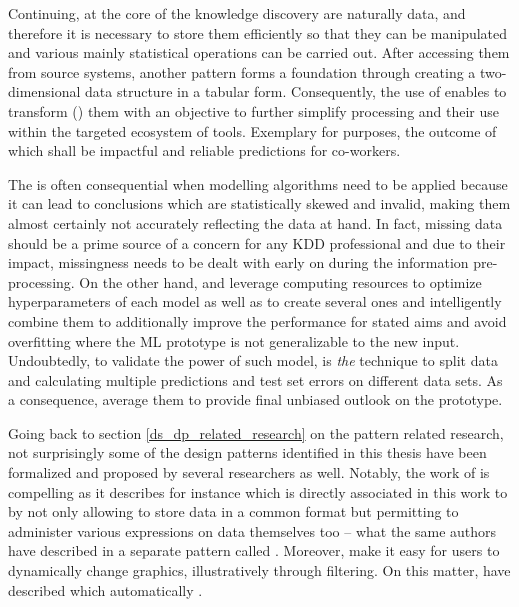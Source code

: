 Continuing, at the core of the knowledge discovery are naturally data, and therefore it is necessary to store them efficiently so that they can be manipulated and various mainly statistical operations can be carried out.
After accessing them from source systems, another pattern forms a foundation through creating a two-dimensional data structure in a tabular form. 
Consequently, the use of  enables to transform () them with an objective to further simplify processing and their use within the targeted ecosystem of tools. 
Exemplary for  purposes, the outcome of which shall be impactful and reliable predictions for co-workers.

The  is often consequential when modelling algorithms need to be applied because it can lead to conclusions which are statistically skewed and invalid, making them almost certainly not accurately reflecting the data at hand. 
In fact, missing data should be a prime source of a concern for any \ac{KDD} professional and due to their impact, missingness needs to be dealt with early on during the information pre-processing.
On the other hand,  and  leverage computing resources to optimize hyperparameters of each model as well as to create several ones and intelligently combine them to additionally improve the performance for stated aims and avoid overfitting where the \ac{ML} prototype is not generalizable to the new input.  
Undoubtedly, to validate the power of such model,  is \emph{the} technique to split data and calculating multiple predictions and test set errors on different data sets. 
As a consequence, average them to provide final unbiased outlook on the prototype.

Going back to section \ref{ds_dp_related_research} on the pattern related research, not surprisingly some of the design patterns identified in this thesis have been formalized and proposed by several researchers as well. 
Notably, the work of \textcite{HeffreMheer2006} is compelling as it describes for instance  which is directly associated in this work to  by not only allowing to store data in a common format but permitting to administer various expressions on data themselves too -- what the same authors have described in a separate pattern called .
Moreover,  make it easy for users to dynamically change graphics, illustratively through filtering. 
On this matter, \textcite[859]{HeffreMheer2006} have described  which automatically .

